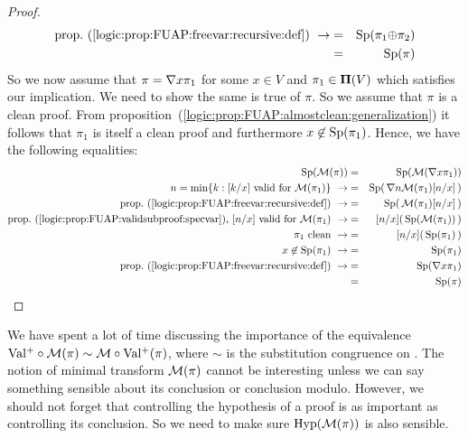 \begin{proof}
\begin{eqnarray*}
    \mbox{prop.~(\ref{logic:prop:FUAP:freevar:recursive:def})}\ \rightarrow
    &=&\spec(\pi_{1}\pon\pi_{2})\\
    &=&\spec(\pi)
    \end{eqnarray*}
So we now assume that $\pi=\mbox{$\nabla$} x\pi_{1}$ for some $x\in V$ and
$\pi_{1}\in\mbox{${\bf\Pi}(V)$}$ which satisfies our implication. We need to show
the same is true of $\pi$. So we assume that $\pi$ is a clean proof.
From proposition~(\ref{logic:prop:FUAP:almostclean:generalization})
it follows that $\pi_{1}$ is itself a clean proof and furthermore
$x\not\in\mbox{\rm Sp}(\pi_{1})$. Hence, we have the following equalities:
    \begin{eqnarray*}
    \spec({\cal M}(\pi))&=&\spec({\cal M}(\gen x\pi_{1}))\\
    n=\min\{k:[k/x]\mbox{\ valid for\ }{\cal M}(\pi_{1})\}\
    \rightarrow
    &=&\spec(\,\gen n{\cal M}(\pi_{1})[n/x]\,)\\
    \mbox{prop.~(\ref{logic:prop:FUAP:freevar:recursive:def})}\ \rightarrow
    &=&\spec(\,{\cal M}(\pi_{1})[n/x]\,)\\
    \mbox{prop.~(\ref{logic:prop:FUAP:validsubproof:specvar}),
    $[n/x]$ valid for ${\cal M}(\pi_{1})$}\ \rightarrow
    &=&[n/x](\,\spec({\cal M}(\pi_{1}))\,)\\
    \mbox{$\pi_{1}$ clean}\ \rightarrow
    &=&[n/x](\,\spec(\pi_{1})\,)\\
    x\not\in\spec(\pi_{1})\ \rightarrow
    &=&\spec(\pi_{1})\\
    \mbox{prop.~(\ref{logic:prop:FUAP:freevar:recursive:def})}\ \rightarrow
    &=&\spec(\gen x\pi_{1})\\
    &=&\spec(\pi)
    \end{eqnarray*}
\end{proof}

We have spent a lot of time discussing the importance of the
equivalence $\mbox{$\rm Val^{+}$}\circ{\cal M}(\pi)\sim{\cal M}\circ\mbox{$\rm Val^{+}$}(\pi)$,
where $\sim$ is the substitution congruence on \pvb. The notion of
minimal transform ${\cal M}(\pi)$ cannot be interesting unless we
can say something sensible about its conclusion or conclusion
modulo. However, we should not forget that controlling the
hypothesis of a proof is as important as controlling its conclusion.
So we need to make sure $\mbox{\rm Hyp}({\cal M}(\pi))$ is also sensible.

